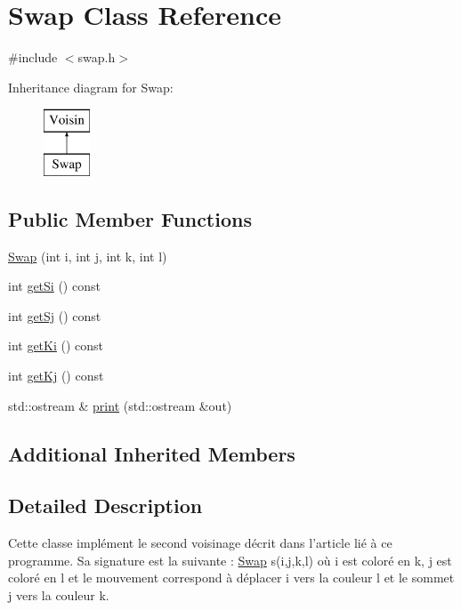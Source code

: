 \hypertarget{classSwap}{\section{Swap Class Reference}
\label{classSwap}
}


{\ttfamily \#include $<$swap.\-h$>$}

Inheritance diagram for Swap\-:\begin{figure}[H]
\begin{center}
\leavevmode
\includegraphics[height=2.000000cm]{classSwap}
\end{center}
\end{figure}
\subsection*{Public Member Functions}
\begin{DoxyCompactItemize}
\item 
\hyperlink{classSwap_a3afbc536a0c0ac95f29a93b9d318e2f0}{Swap} (int i, int j, int k, int l)
\item 
int \hyperlink{classSwap_a23dc26211a5fab2b455024ce063c0225}{get\-Si} () const 
\item 
int \hyperlink{classSwap_a58dbe1b75315cefde176ff15403715a9}{get\-Sj} () const 
\item 
int \hyperlink{classSwap_ade5279a41cf97b84e0582054ef8f8939}{get\-Ki} () const 
\item 
int \hyperlink{classSwap_a2cc551096dde6d0d437b4f0db618b3be}{get\-Kj} () const 
\item 
std\-::ostream \& \hyperlink{classSwap_af848d621402c8f39727adad5e0bff368}{print} (std\-::ostream \&out)
\end{DoxyCompactItemize}
\subsection*{Additional Inherited Members}


\subsection{Detailed Description}
Cette classe implément le second voisinage décrit dans l'article lié à ce programme. Sa signature est la suivante \-: \hyperlink{classSwap}{Swap} s(i,j,k,l) où i est coloré en k, j est coloré en l et le mouvement correspond à déplacer i vers la couleur l et le sommet j vers la couleur k. 

